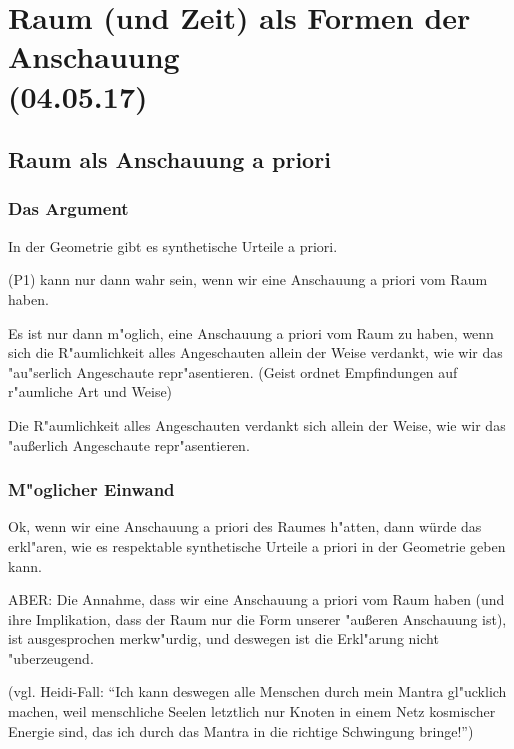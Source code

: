 \documentclass[emulatestandardclasses]{scrartcl}
\begin{document}
\section{Raum (und Zeit) als Formen der Anschauung\\(04.05.17)}

\subsection{Raum als Anschauung a priori}

\subsubsection{Das Argument}

\begin{description}[leftmargin=!,labelwidth=\widthof{\bfseries P2}]
  \item[P1] In der Geometrie gibt es synthetische Urteile a priori.
  \item[P2] (P1) kann nur dann wahr sein, wenn wir eine Anschauung a priori vom Raum haben.
  \item[P3] Es ist nur dann m"oglich, eine Anschauung a priori vom Raum zu haben, wenn sich die R"aumlichkeit alles Angeschauten allein der Weise verdankt, wie wir das "au"serlich Angeschaute repr"asentieren. (Geist ordnet Empfindungen auf r"aumliche Art und Weise)
  \item[K] Die R"aumlichkeit alles Angeschauten verdankt sich allein der Weise, wie wir das "außerlich Angeschaute repr"asentieren.
\end{description}

\subsubsection{M"oglicher Einwand}

Ok, wenn wir eine Anschauung a priori des Raumes h"atten, dann würde das erkl"aren, wie es respektable synthetische Urteile a priori in der Geometrie geben kann.

ABER: Die Annahme, dass wir eine Anschauung a priori vom Raum haben (und ihre Implikation, dass der Raum nur die Form unserer "außeren Anschauung ist), ist ausgesprochen merkw"urdig, und deswegen ist die Erkl"arung nicht "uberzeugend.

(vgl. Heidi-Fall: "`Ich kann deswegen alle Menschen durch mein Mantra gl"ucklich machen, weil menschliche Seelen letztlich nur Knoten in einem Netz kosmischer Energie sind, das ich durch das Mantra in die richtige Schwingung bringe!"')
\end{document}
